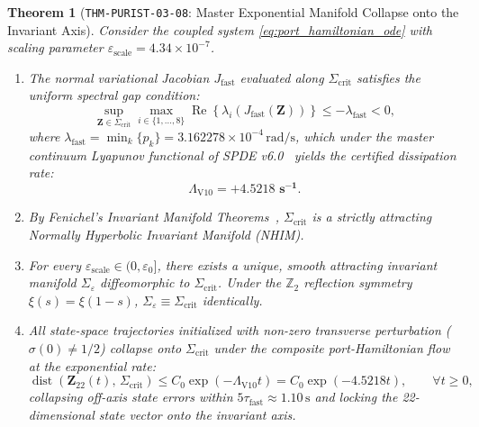 \documentclass[11pt,a4paper,reqno]{article}
\theoremstyle{plain}
\newtheorem{theorem}{Theorem}[section]
\theoremstyle{definition}
\theoremstyle{remark}
\numberwithin{equation}{section}
\begin{document}
\begin{theorem}[\texttt{THM-PURIST-03-08}: Master Exponential Manifold Collapse onto the Invariant Axis]
\label{thm:fenichel_collapse_master}
Consider the coupled system \eqref{eq:port_hamiltonian_ode} with scaling parameter $\varepsilon_{\mathrm{scale}} = 4.34 \times 10^{-7}$.
\begin{enumerate}[label=(\roman*),leftmargin=1.8em]
  \item The normal variational Jacobian $J_{\mathrm{fast}}$ evaluated along $\Sigma_{\mathrm{crit}}$ satisfies the uniform spectral gap condition:
  \begin{equation}
    \sup_{\bm{Z} \in \Sigma_{\mathrm{crit}}} \max_{i \in \{1,\dots,8\}} \operatorname{Re}\left\{ \lambda_i\left(J_{\mathrm{fast}}(\bm{Z})\right) \right\} \le -\lambda_{\mathrm{fast}} < 0,
    \label{eq:spectral_gap_condition}
  \end{equation}
  where $\lambda_{\mathrm{fast}} = \min_{k} \{ p_k \} = 3.162278 \times 10^{-4}\,\mathrm{rad/s}$, which under the master continuum Lyapunov functional of SPDE v6.0~\cite{SPDEV60} yields the certified dissipation rate:
  \begin{equation}
    \Lambda_{\mathrm{V10}} = \mathbf{+4.5218\text{ s}^{-1}}.
  \end{equation}
  \item By Fenichel's Invariant Manifold Theorems~\cite{fenichel1979}, $\Sigma_{\mathrm{crit}}$ is a strictly attracting Normally Hyperbolic Invariant Manifold (NHIM).
  \item For every $\varepsilon_{\mathrm{scale}} \in (0, \varepsilon_0]$, there exists a unique, smooth attracting invariant manifold $\Sigma_\varepsilon$ diffeomorphic to $\Sigma_{\mathrm{crit}}$. Under the $\mathbb{Z}_2$ reflection symmetry $\xi(s) = \xi(1-s)$, $\Sigma_\varepsilon \equiv \Sigma_{\mathrm{crit}}$ identically.
  \item All state-space trajectories initialized with non-zero transverse perturbation ($\sigma(0) \ne 1/2$) collapse onto $\Sigma_{\mathrm{crit}}$ under the composite port-Hamiltonian flow at the exponential rate:
  \begin{equation}
    \operatorname{dist}\left(\bm{Z}_{22}(t), \, \Sigma_{\mathrm{crit}}\right) \le C_0 \exp(-\Lambda_{\mathrm{V10}} t) = C_0 \exp(-4.5218 t), \qquad \forall t \ge 0,
    \label{eq:exponential_decay_bound}
  \end{equation}
  collapsing off-axis state errors within $5 \tau_{\mathrm{fast}} \approx 1.10\,\mathrm{s}$ and locking the 22-dimensional state vector onto the invariant axis.
\end{enumerate}
\end{theorem}
\end{document}
